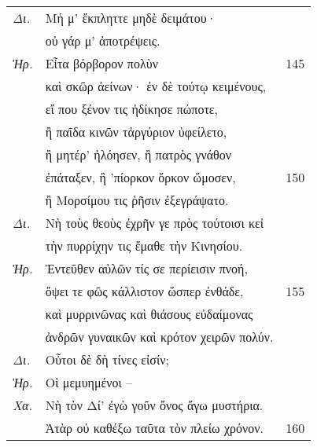 \documentclass[13pt]{article}
\begin{document}
\begin{greek}
\begin{multicols}{2}
\begin{parcolumns}[colwidths={1=1.5em, 2=0.9\linewidth}]{2}
\end{parcolumns}
\end{multicols}

\newpage

\begin{spacing}{1.5}

\begin{tabularx}{\textwidth}{@{}lXr@{}}
  \textit{Δι.} & \hspace*{6em}Μή μ' ἔκπληττε μηδὲ δειμάτου· & \\
  & οὐ γάρ μ' ἀποτρέψεις. & \\
  \textit{Ἡρ.} & \hspace*{9.5em}Εἶτα βόρβορον πολὺν & 145 \\
  & καὶ σκῶρ ἀείνων· ἐν δὲ τούτῳ κειμένους, & \\
  & εἴ που ξένον τις ἠδίκησε πώποτε, & \\
  & ἢ παῖδα κινῶν τἀργύριον ὑφείλετο, & \\
  & ἢ μητέρ' ἠλόησεν, ἢ πατρὸς γνάθον & \\
  & ἐπάταξεν, ἢ 'πίορκον ὅρκον ὤμοσεν, & 150 \\
  & ἢ Μορσίμου τις ῥῆσιν ἐξεγράψατο. & \\
  \textit{Δι.} & Νὴ τοὺς θεοὺς ἐχρῆν γε πρὸς τούτοισι κεἰ & \\
  & τὴν πυρρίχην τις ἔμαθε τὴν Κινησίου. & \\
  \textit{Ἡρ.} & Ἐντεῦθεν αὐλῶν τίς σε περίεισιν πνοή, & \\
  & ὄψει τε φῶς κάλλιστον ὥσπερ ἐνθάδε, & 155 \\
  & καὶ μυρρινῶνας καὶ θιάσους εὐδαίμονας & \\
  & ἀνδρῶν γυναικῶν καὶ κρότον χειρῶν πολύν. & \\
  \textit{Δι.} & Οὗτοι δὲ δὴ τίνες εἰσίν; & \\
  \textit{Ἡρ.} & \hspace*{10em}Οἱ μεμυημένοι –  & \\
  \textit{Χα.} & Νὴ τὸν Δί' ἐγὼ γοῦν ὄνος ἄγω μυστήρια. & \\
  & Ἀτὰρ οὐ καθέξω ταῦτα τὸν πλείω χρόνον. & 160 \\

\end{tabularx}

\end{spacing}

\newpage


\end{greek}
\end{document}
